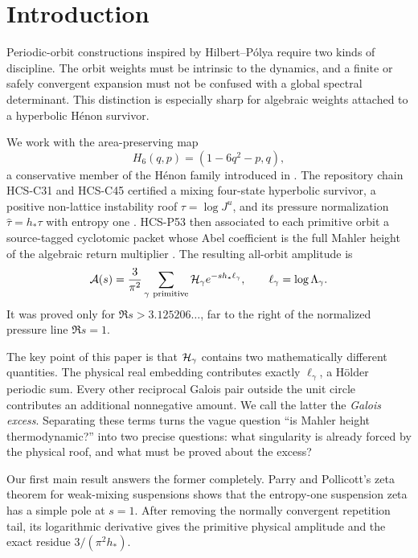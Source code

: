 \section{Introduction}

Periodic-orbit constructions inspired by Hilbert--P\'olya require two kinds
of discipline.  The orbit weights must be intrinsic to the dynamics, and a
finite or safely convergent expansion must not be confused with a global
spectral determinant.  This distinction is especially sharp for algebraic
weights attached to a hyperbolic H\'enon survivor.

We work with the area-preserving map
\[
H_6(q,p)=(1-6q^2-p,q),
\]
a conservative member of the H\'enon family introduced in
\cite{Henon1976}.  The repository chain HCS-C31 and HCS-C45 certified a
mixing four-state hyperbolic survivor, a positive non-lattice instability
roof \(\tau=\log J^u\), and its pressure normalization
\(\widehat\tau=h_*\tau\) with entropy one
\cite{WangP31,WangP45}.  HCS-P53 then associated to each primitive orbit a
source-tagged cyclotomic packet whose Abel coefficient is the full Mahler
height of the algebraic return multiplier \cite{WangP53}.  The resulting
all-orbit amplitude is
\begin{equation}
\mathcal A(s)=\frac3{\pi^2}
\sum_{\gamma\ \mathrm{primitive}}
\mathcal H_\gamma e^{-s h_*\ell_\gamma},
\qquad
\ell_\gamma=\log\Lambda_\gamma.
\label{eq:total-amplitude}
\end{equation}
It was proved only for \(\Re s>3.125206\ldots\), far to the right of the
normalized pressure line \(\Re s=1\).

The key point of this paper is that \(\mathcal H_\gamma\) contains two
mathematically different quantities.  The physical real embedding contributes
exactly \(\ell_\gamma\), a H\"older periodic sum.  Every other reciprocal
Galois pair outside the unit circle contributes an additional nonnegative
amount.  We call the latter the \emph{Galois excess}.  Separating these terms
turns the vague question ``is Mahler height thermodynamic?'' into two precise
questions: what singularity is already forced by the physical roof, and what
must be proved about the excess?

Our first main result answers the former completely.  Parry and Pollicott's
zeta theorem for weak-mixing suspensions \cite[Theorem~6.3 and
Corollary~6.3.1]{ParryPollicott1990} shows that the entropy-one suspension
zeta has a simple pole at \(s=1\).  After removing the normally convergent
repetition tail, its logarithmic derivative gives the primitive physical
amplitude and the exact residue \(3/(\pi^2h_*)\).

